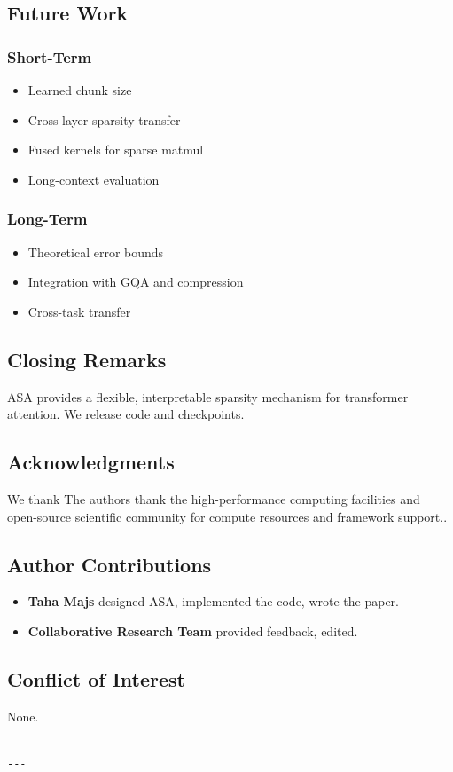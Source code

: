 \subsection{Future Work}

\subsubsection{Short-Term}
\begin{itemize}
\item Learned chunk size
\item Cross-layer sparsity transfer
\item Fused kernels for sparse matmul
\item Long-context evaluation

\end{itemize}
\subsubsection{Long-Term}
\begin{itemize}
\item Theoretical error bounds
\item Integration with GQA and compression
\item Cross-task transfer

\end{itemize}
\subsection{Closing Remarks}

ASA provides a flexible, interpretable sparsity mechanism for transformer 
attention. We release code and checkpoints.

\subsection{Acknowledgments}

We thank The authors thank the high-performance computing facilities and open-source scientific community for compute resources and framework support..

\subsection{Author Contributions}

\begin{itemize}
\item \textbf{Taha Majs} designed ASA, implemented the code, wrote the paper.
\item \textbf{Collaborative Research Team} provided feedback, edited.

\end{itemize}
\subsection{Conflict of Interest}

None.
\begin{lstlisting}

---
\end{lstlisting}